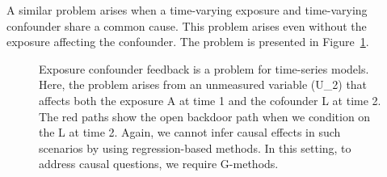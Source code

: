 \documentclass[
  singlecolumn]{article}
\begin{document}
A similar problem arises when a time-varying exposure and time-varying
confounder share a common cause. This problem arises even without the
exposure affecting the confounder. The problem is presented in
Figure~\ref{fig-dag-time-vary-common-cause-A1-l1}.

\begin{figure}


\caption{\label{fig-dag-time-vary-common-cause-A1-l1}Exposure confounder
feedback is a problem for time-series models. Here, the problem arises
from an unmeasured variable (U\_2) that affects both the exposure A at
time 1 and the cofounder L at time 2. The red paths show the open
backdoor path when we condition on the L at time 2. Again, we cannot
infer causal effects in such scenarios by using regression-based
methods. In this setting, to address causal questions, we require
G-methods.}

\end{figure}%
\end{document}
